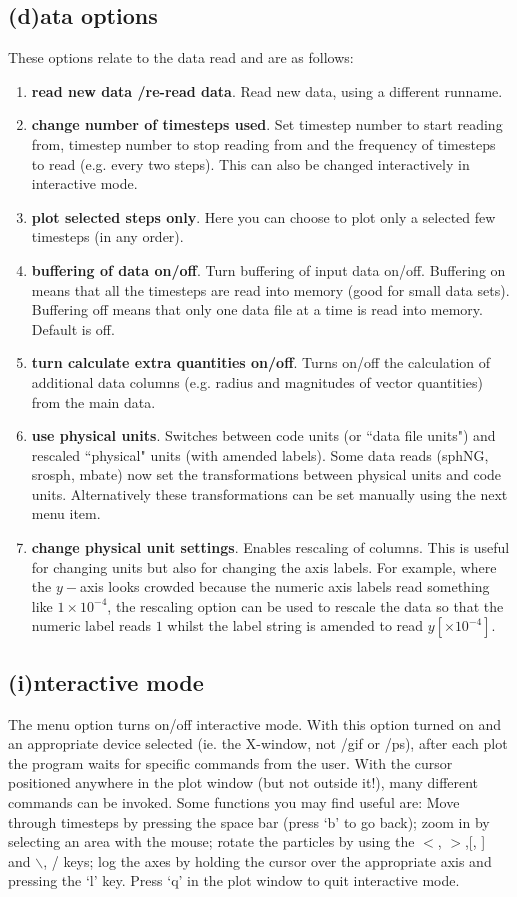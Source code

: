 \documentclass[a4paper,11pt]{article}
\begin{document}
\subsection{(d)ata options}
These options relate to the data read and are as follows:
\begin{enumerate}
\item \textbf{read new data /re-read data}. Read new data, using a different runname.
\item \textbf{change number of timesteps used}. Set timestep number to start
reading from, timestep number to stop reading from and the frequency of
timesteps to read (e.g. every two steps). This can also be changed interactively in
interactive mode.
\item \textbf{plot selected steps only}. Here you can choose to plot only a selected
few timesteps (in any order).
\item \textbf{buffering of data on/off}. Turn buffering of input data on/off.
Buffering on means that all the timesteps are read into memory (good for small
data sets). Buffering off means that only one data file at a time is read into
memory. Default is off.
\item \textbf{turn calculate extra quantities on/off}. Turns on/off the calculation
of additional data columns (e.g. radius and magnitudes of vector quantities) from the main data.
\item \textbf{use physical units}. Switches between code units (or ``data file units") and rescaled
``physical" units (with amended labels). Some data reads (sphNG, srosph, mbate) now set the transformations
between physical units and code units. Alternatively these transformations can be set manually using the next menu
item.
\item \textbf{change physical unit settings}. Enables rescaling of columns. This
is useful for changing units but also for changing the axis labels. For
example, where the $y-$axis looks crowded because the numeric axis labels read something
like $1\times 10^{-4}$, the rescaling option can be used to rescale the data so
that the numeric label reads $1$ whilst the label string is amended to read $y
[\times 10^{-4}]$.
\end{enumerate}

\subsection{(i)nteractive mode}
 The menu option turns on/off interactive mode. With this option turned on and
an appropriate device selected (ie. the X-window, not /gif or /ps), after
each plot the program waits for specific commands from the user. With the cursor
positioned anywhere in the plot window (but not outside it!), many different
commands can be invoked. Some functions you may find useful are: Move through timesteps by pressing the space bar (press
 `b' to go back); zoom in by selecting an area with the mouse; rotate the
particles by using the $<$, $>$,[, ] and $\backslash$, / keys; log the axes by holding the cursor
over the appropriate axis and pressing the `l' key. Press `q' in the plot window
to quit interactive mode.
\end{document}
